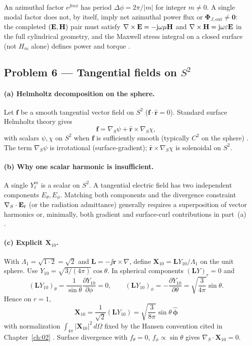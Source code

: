 An azimuthal factor $e^{\jj m\phi}$ has period $\Delta\phi=2\pi/|m|$ for integer $m\neq0$. A single modal factor does not, by itself, imply net azimuthal power flux or $\boldsymbol{\Phi}_{J,\mathrm{out}}\neq\mathbf{0}$: the completed $(\mathbf{E},\mathbf{H})$ pair must satisfy $\nabla\times\mathbf{E}=-\mathrm{j}\omega\mu\mathbf{H}$ and $\nabla\times\mathbf{H}=\mathrm{j}\omega\varepsilon\mathbf{E}$ in the full cylindrical geometry, and the Maxwell stress integral on a closed surface (not $H_m$ alone) defines power and torque \cite{stratton1941,harrington2001}.

\subsection*{Problem 6 --- Tangential fields on $S^2$}

\paragraph{(a) Helmholtz decomposition on the sphere.}
Let $\mathbf{f}$ be a smooth tangential vector field on $S^2$ ($\mathbf{f}\cdot\hat{\mathbf{r}}=0$). Standard surface Helmholtz theory gives
\[
\mathbf{f}=\nabla_S\psi+\hat{\mathbf{r}}\times\nabla_S\chi,
\]
with scalars $\psi,\chi$ on $S^2$ when $\mathbf{f}$ is sufficiently smooth (typically $C^2$ on the sphere) \cite{hansen1988,stratton1941}. The term $\nabla_S\psi$ is irrotational (surface-gradient); $\hat{\mathbf{r}}\times\nabla_S\chi$ is solenoidal on $S^2$.

\paragraph{(b) Why one scalar harmonic is insufficient.}
A single $Y_\ell^m$ is a scalar on $S^2$. A tangential electric field has two independent components $E_\theta,E_\phi$. Matching both components and the divergence constraint $\nabla_S\cdot\mathbf{E}_t$ (or the radiation admittance) generally requires a superposition of vector harmonics or, minimally, both gradient and surface-curl contributions in part~(a) \cite{stratton1941,hansen1988}.

\paragraph{(c) Explicit $\mathbf{X}_{10}$.}
With $\Lambda_1=\sqrt{1\cdot2}=\sqrt{2}$ and $\mathbf{L}=-\jj\mathbf{r}\times\nabla$, define $\mathbf{X}_{10}=\mathbf{L}Y_{10}/\Lambda_1$ on the unit sphere. Use $Y_{10}=\sqrt{3/(4\pi)}\cos\theta$. In spherical components $(\mathbf{L}Y)_r=0$ and
\[
(\mathbf{L}Y_{10})_\theta=\frac{1}{\sin\theta}\frac{\partial Y_{10}}{\partial\phi}=0,\qquad
(\mathbf{L}Y_{10})_\phi=-\frac{\partial Y_{10}}{\partial\theta}
=\sqrt{\frac{3}{4\pi}}\sin\theta.
\]
Hence on $r=1$,
\[
\mathbf{X}_{10}=\frac{1}{\sqrt{2}}(\mathbf{L}Y_{10})
=\sqrt{\frac{3}{8\pi}}\sin\theta\,\hat{\boldsymbol\phi}
\]
with normalization $\int_{4\pi}|\mathbf{X}_{10}|^2\,d\Omega$ fixed by the Hansen convention cited in Chapter~\ref{ch:02} \cite{stratton1941,hansen1988}. Surface divergence with $f_\theta=0$, $f_\phi\propto\sin\theta$ gives $\nabla_S\cdot\mathbf{X}_{10}=0$.

